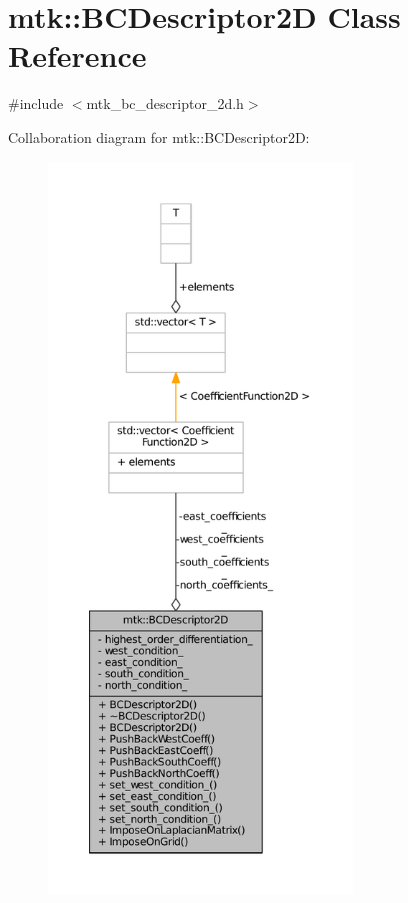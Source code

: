 \hypertarget{classmtk_1_1BCDescriptor2D}{\section{mtk\+:\+:B\+C\+Descriptor2\+D Class Reference}
\label{classmtk_1_1BCDescriptor2D}
}


{\ttfamily \#include $<$mtk\+\_\+bc\+\_\+descriptor\+\_\+2d.\+h$>$}



Collaboration diagram for mtk\+:\+:B\+C\+Descriptor2\+D\+:\nopagebreak
\begin{figure}[H]
\begin{center}
\leavevmode
\includegraphics[height=550pt]{classmtk_1_1BCDescriptor2D__coll__graph}
\end{center}
\end{figure}
